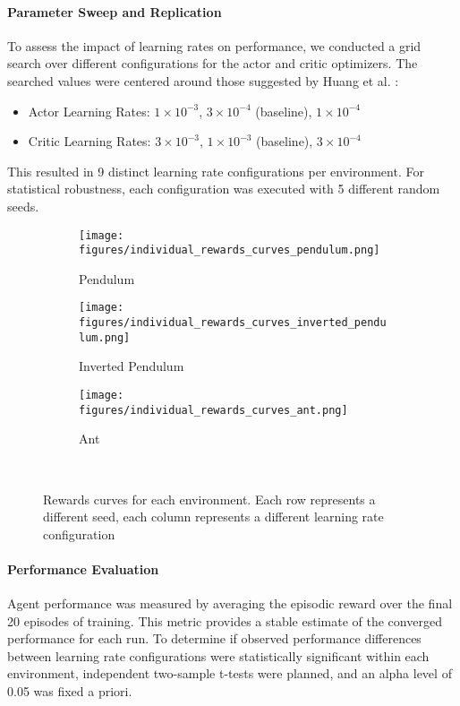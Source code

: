 \documentclass{article}
\begin{document}
\paragraph{Parameter Sweep and Replication}
To assess the impact of learning rates on performance, we conducted a grid search over different configurations for the actor and critic optimizers. The searched values were centered around those suggested by Huang et al. \cite{shengyi2022the37implementation}:
\begin{itemize}
    \item Actor Learning Rates: \(1 \times 10^{-3}\), \textbf{\(3 \times 10^{-4}\)} (baseline), \(1 \times 10^{-4}\)
    \item Critic Learning Rates: \(3 \times 10^{-3}\), \textbf{\(1 \times 10^{-3}\)} (baseline), \(3 \times 10^{-4}\)
\end{itemize}
This resulted in 9 distinct learning rate configurations per environment. For statistical robustness, each configuration was executed with 5 different random seeds.

\begin{figure}[ht!]
    \centering
    \begin{subfigure}{0.48\textwidth}
        \centering
        \texttt{[image: figures/individual\_rewards\_curves\_pendulum.png]}
        \caption{Pendulum}
    \end{subfigure}
    \begin{subfigure}{0.48\textwidth}
        \centering
        \texttt{[image: figures/individual\_rewards\_curves\_inverted\_pendulum.png]}
        \caption{Inverted Pendulum}
    \end{subfigure}
    \begin{subfigure}{0.48\textwidth}
        \centering
        \texttt{[image: figures/individual\_rewards\_curves\_ant.png]}
        \caption{Ant}
    \end{subfigure}
    \captionsetup{justification=centering} \
    \caption{Rewards curves for each environment. Each row represents a different seed, each column represents a different learning rate configuration}
    \label{fig:rewards_curves}
\end{figure}

\paragraph{Performance Evaluation}
Agent performance was measured by averaging the episodic reward over the final 20 episodes of training. This metric provides a stable estimate of the converged performance for each run. To determine if observed performance differences between learning rate configurations were statistically significant within each environment, independent two-sample t-tests were planned, and an alpha level of 0.05 was fixed a priori.
\end{document}
